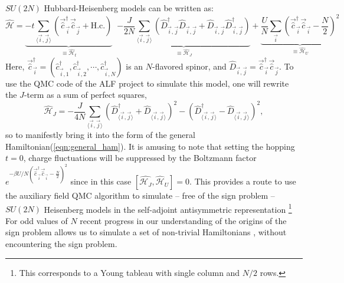 $SU(2N)$ Hubbard-Heisenberg \cite{Assaad04,Lang13} models can be written as:
\begin{equation}
 \hat{\mathcal{H}}  =  
 \underbrace{ - t \sum_{ \langle \vec{i},\vec{j} \rangle }    \left(  \vec{\hat{c}}^{\dagger}_{\vec{i}}  \vec{\hat{c}}^{\phantom{\dagger}}_{\vec{j}} + \text{H.c.} \right) }_{\equiv \hat{\mathcal{H}}_t} \; \; 
\underbrace{ -\frac{J}{2 N}  \sum_{ \langle \vec{i},\vec{j} \rangle  } \left(
           \hat{D}^{\dagger}_{ \vec{i},\vec{j} }\hat{D}^{\phantom\dagger}_{ \vec{i},\vec{j}}  +
            \hat{D}^{\phantom\dagger}_{ \vec{i},\vec{j} } \hat{D}^{\dagger}_{ \vec{i},\vec{j} }  \right) }_{\equiv\hat{\mathcal{H}}_J}
            + 
 \underbrace{\frac{U}{N}  \sum_{\vec{i}} \left(
             \vec{\hat{c}}^{\dagger}_{\vec{i}}  \vec{\hat{c}}^{\phantom\dagger}_{\vec{i}} -  {\frac{N}{2} } \right)^2}_{\equiv \hat{\mathcal{H}}_U}
\end{equation}
Here,
$ \vec{\hat{c}}^{\dagger}_{\vec{i}} =
(\hat{c}^{\dagger}_{\vec{i},1},  \hat{c}^{\dagger}_{\vec{i},2}, \cdots, \hat{c}^{\dagger}_{\vec{i}, N } ) $  is an
$N$-flavored spinor, and $ \hat{D}_{ \vec{i},\vec{j}} = \vec{\hat{c}}^{\dagger}_{\vec{i}}
\vec{\hat{c}}_{\vec{j}}  $.
To use the QMC code of the ALF project  to simulate this model, one will rewrite  the $J$-term as a sum of perfect squares, 
\begin{equation}
        \hat{\mathcal{H}}_J =  -\frac{J}{4 N}  \sum_{  \langle \vec{i}, \vec{j} \rangle }
        \left(\hat{D}^{\dagger}_{  \langle \vec{i}, \vec{j} \rangle  } +  \hat{D}_{  \langle \vec{i}, \vec{j} \rangle }  \right)^2  -
        \left(\hat{D}^{\dagger}_{   \langle \vec{i}, \vec{j} \rangle } -  \hat{D}_{  \langle \vec{i}, \vec{j} \rangle}  \right)^2,
\end{equation}
so to manifestly bring it into the form of the general Hamiltonian(\ref{eqn:general_ham}). 
It is amusing to note that setting the hopping $t=0$,    charge fluctuations  will be suppressed by the  Boltzmann factor $e^{-\beta U /N \left(  \vec{\hat{c}}^{\dagger}_{\vec{i}}  \vec{\hat{c}}^{\phantom\dagger}_{\vec{i}} -  {\frac{N}{2} } \right)^2 } $ 
since in this case  $ \left[   \hat{\mathcal{H}_J}, \hat{\mathcal{H}}_U \right]  = 0 $.
This provides a route to use the auxiliary field QMC algorithm  to simulate -- free of the sign problem -- $SU(2N)$ Heisenberg models in the self-adjoint antisymmetric representation  \footnote{ This corresponds to a Young tableau with single column and $N/2$ rows.}  
For odd values of $N$ recent progress  in our understanding of the  origins of the sign problem \cite{Wei16}  allows us to simulate  a set of non-trivial Hamiltonians \cite{Li15,Assaad16},  without encountering the sign problem.

